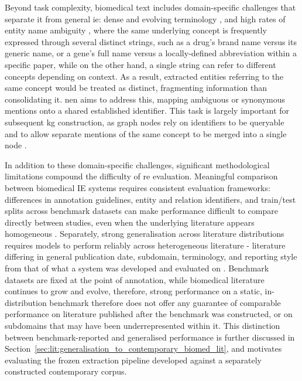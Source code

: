 Beyond task complexity, biomedical text includes domain-specific challenges that separate it from general \gls{ie}: dense and evolving terminology \cite{krauthammer2004term, da2015management}, and high rates of entity name ambiguity \cite{zhao2021recent}, where the same underlying concept is frequently expressed through several distinct strings, such as a drug's brand name versus its generic name, or a gene's full name versus a locally-defined abbreviation within a specific paper, while on the other hand, a single string can refer to different concepts depending on context. As a result, extracted entities referring to the same concept would be treated as distinct, fragmenting information than consolidating it. \gls{nen} aims to address this, mapping ambiguous or synonymous mentions onto a shared established identifier. This task is largely important for subsequent \gls{kg} construction, as graph nodes rely on identifiers to be queryable and to allow separate mentions of the same concept to be merged into a single node \pref.

In addition to these domain-specific challenges, significant methodological limitations compound the difficulty of \gls{re} evaluation. Meaningful comparison between biomedical IE systems requires consistent evaluation frameworks: differences in annotation guidelines, entity and relation identifiers, and train/test splits across benchmark datasets can make performance difficult to compare directly between studies, even when the underlying literature appears homogeneous \pref. Separately, strong generalisation across literature distributions requires models to perform reliably across heterogeneous literature - literature differing in general publication date, subdomain, terminology, and reporting style from that of what a system was developed and evaluated on \pref. Benchmark datasets are fixed at the point of annotation, while biomedical literature continues to grow and evolve, therefore, strong performance on a static, in-distribution benchmark therefore does not offer any guarantee of comparable performance on literature published after the benchmark was constructed, or on subdomains that may have been underrepresented within it. This distinction between benchmark-reported and generalised performance is further discussed in Section~\ref{sec:lit:generalisation_to_contemporary_biomed_lit}, and motivates evaluating the frozen extraction pipeline developed against a separately constructed contemporary corpus.


